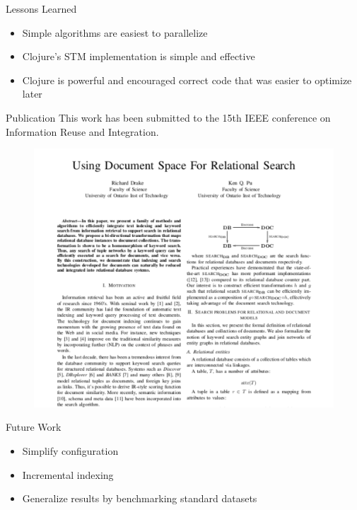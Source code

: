 \documentclass[compress]{beamer}
\begin{document}
		\begin{frame}{Lessons Learned}
			\begin{itemize}
				\item Simple algorithms are easiest to parallelize
				\item Clojure's STM implementation is simple and effective
				\item Clojure is powerful and encouraged correct code that was easier to optimize later
			\end{itemize}
		\end{frame}
		
		\begin{frame}{Publication}
			This work has been submitted to the 15th IEEE conference on Information Reuse and Integration.

			\begin{figure}
				\centering
				\includegraphics[scale=0.3]{figures/paper-thumbnail}
			\end{figure}
		\end{frame}
		
		\begin{frame}{Future Work}
			\begin{itemize}
				\item Simplify configuration
				\item Incremental indexing
				\item Generalize results by benchmarking standard datasets
			\end{itemize}
		\end{frame}
	
	\section*{}
	
	\frame{\titlepage}
\end{document}
